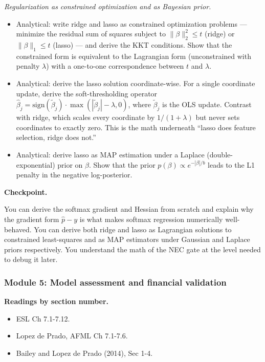 \emph{Regularization as constrained optimization and as Bayesian prior.}

\begin{itemize}
\tightlist
\item
  Analytical: write ridge and lasso as constrained optimization problems
  --- minimize the residual sum of squares subject to
  \(\|\beta\|_2^2 \leq t\) (ridge) or \(\|\beta\|_1 \leq t\) (lasso) ---
  and derive the KKT conditions. Show that the constrained form is
  equivalent to the Lagrangian form (unconstrained with penalty
  \(\lambda\)) with a one-to-one correspondence between \(t\) and
  \(\lambda\).
\item
  Analytical: derive the lasso solution coordinate-wise. For a single
  coordinate update, derive the soft-thresholding operator
  \(\hat{\beta}_j = \text{sign}(\tilde{\beta}_j) \cdot \max(|\tilde{\beta}_j| - \lambda, 0)\),
  where \(\tilde{\beta}_j\) is the OLS update. Contrast with ridge,
  which scales every coordinate by \(1/(1 + \lambda)\) but never sets
  coordinates to exactly zero. This is the math underneath ``lasso does
  feature selection, ridge does not.''
\item
  Analytical: derive lasso as MAP estimation under a Laplace
  (double-exponential) prior on \(\beta\). Show that the prior
  \(p(\beta) \propto e^{-|\beta|/b}\) leads to the L1 penalty in the
  negative log-posterior.
\end{itemize}

\textbf{Checkpoint.}

You can derive the softmax gradient and Hessian from scratch and explain
why the gradient form \(\hat{p} - y\) is what makes softmax regression
numerically well-behaved. You can derive both ridge and lasso as
Lagrangian solutions to constrained least-squares and as MAP estimators
under Gaussian and Laplace priors respectively. You understand the math
of the NEC gate at the level needed to debug it later.

\subsubsection{Module 5: Model assessment and financial
validation}\label{module-5-model-assessment-and-financial-validation}

\textbf{Readings by section number.}

\begin{itemize}
\tightlist
\item
  ESL Ch 7.1-7.12.
\item
  Lopez de Prado, AFML Ch 7.1-7.6.
\item
  Bailey and Lopez de Prado (2014), Sec 1-4.
\end{itemize}

